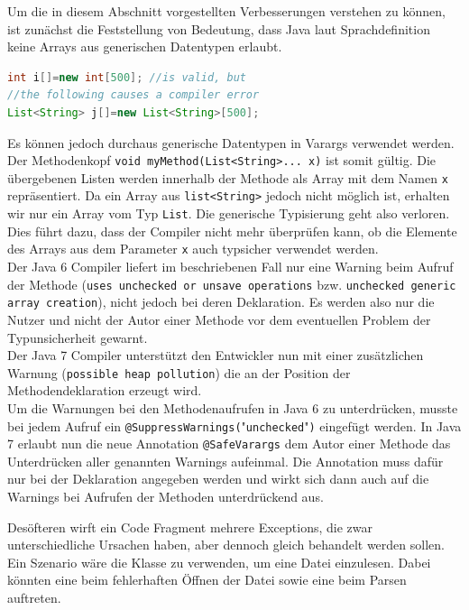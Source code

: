 \documentclass[times, 10pt,twocolumn]{article}
\begin{document}
Um die in diesem Abschnitt vorgestellten Verbesserungen verstehen zu können, ist zunächst die Feststellung von Bedeutung, dass Java laut Sprachdefinition keine Arrays aus generischen Datentypen erlaubt.
\begin{lstlisting}[language=java,breaklines=true]
int i[]=new int[500]; //is valid, but
//the following causes a compiler error
List<String> j[]=new List<String>[500];
\end{lstlisting}
Es können jedoch durchaus generische Datentypen in Varargs verwendet werden. Der Methodenkopf \texttt{void myMethod(List<String>... x)} ist somit gültig. Die übergebenen Listen werden innerhalb der Methode als Array mit dem Namen \texttt{x} repräsentiert. Da ein Array aus \texttt{list<String>} jedoch nicht möglich ist, erhalten wir nur ein Array vom Typ \texttt{List}. Die generische Typisierung geht also verloren.\\

Dies führt dazu, dass der Compiler nicht mehr überprüfen kann, ob die Elemente des Arrays aus dem Parameter \texttt{x} auch typsicher verwendet werden.\cite{v2bJava7}\\

Der Java 6 Compiler liefert im beschriebenen Fall nur eine Warning beim Aufruf der Methode (\texttt{uses unchecked or unsave operations} bzw. \texttt{unchecked generic array creation}), nicht jedoch bei deren Deklaration. Es werden also nur die Nutzer und nicht der Autor einer Methode vor dem eventuellen Problem der Typunsicherheit gewarnt.\\

Der Java 7 Compiler unterstützt den Entwickler nun mit einer zusätzlichen Warnung (\texttt{possible heap pollution}) die an der Position der Methodendeklaration erzeugt wird.\\

Um die Warnungen bei den Methodenaufrufen in Java 6 zu unterdrücken, musste bei jedem Aufruf ein 
\texttt{@SuppressWarnings(}"\texttt{unchecked}"\texttt{)} eingefügt werden. In Java 7 erlaubt nun die neue Annotation \texttt{@SafeVarargs} dem Autor einer Methode das Unterdrücken aller genannten Warnings aufeinmal. Die Annotation muss dafür nur bei der Deklaration angegeben werden und wirkt sich dann auch auf die Warnings bei Aufrufen der Methoden unterdrückend aus.

Desöfteren wirft ein Code Fragment mehrere Exceptions, die zwar unterschiedliche Ursachen haben, aber dennoch gleich behandelt
werden sollen. Ein Szenario wäre die Klasse  zu verwenden, um eine Datei einzulesen. Dabei könnten eine 
 beim fehlerhaften Öffnen der Datei sowie eine  beim Parsen auftreten.
\end{document}
